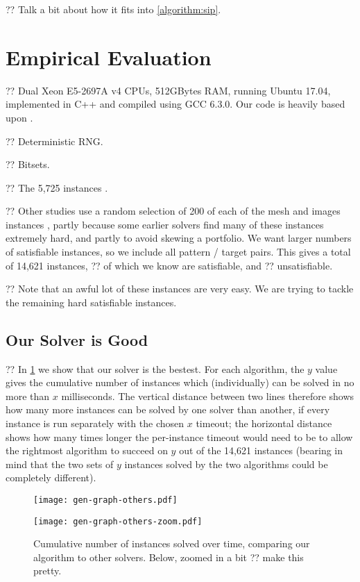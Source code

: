\documentclass{article}
\newcommand{\citet}[1]{\citeauthor{#1} \shortcite{#1}}
\newcommand{\citep}[1]{\cite{#1}}
\begin{document}
?? Talk a bit about how it fits into \cref{algorithm:sip}.

\section{Empirical Evaluation}

?? Dual Xeon E5-2697A v4 CPUs, 512GBytes RAM, running Ubuntu 17.04, implemented in C++ and compiled
using GCC 6.3.0. Our code is heavily based upon \citet{dblp:conf/cp/McCreeshP15}.

?? Deterministic RNG.

?? Bitsets.

?? The 5,725 instances \citep{dblp:conf/lion/KotthoffMS16}.

?? Other studies use a random selection of 200 of each of the mesh and images instances
\citep{DBLP:journals/cviu/DamiandSHJS11}, partly because some earlier solvers find many of these
instances extremely hard, and partly to avoid skewing a portfolio. We want larger numbers of
satisfiable instances, so we include all pattern / target pairs. This gives a total of 14,621
instances, ?? of which we know are satisfiable, and ??  unsatisfiable.

?? Note that an awful lot of these instances are very easy. We are trying to tackle the remaining
hard satisfiable instances.

\subsection{Our Solver is Good}

?? In \cref{figure:others} we show that our solver is the bestest. For each algorithm, the $y$ value
gives the cumulative number of instances which (individually) can be solved in no more than $x$
milliseconds.  The vertical distance between two lines therefore shows how many more instances can
be solved by one solver than another, if every instance is run separately with the chosen $x$
timeout; the horizontal distance shows how many times longer the per-instance timeout would need to
be to allow the rightmost algorithm to succeed on $y$ out of the 14,621 instances (bearing in mind
that the two sets of $y$ instances solved by the two algorithms could be completely different).

\begin{figure}[tb]
    \centering
    \texttt{[image: gen-graph-others.pdf]}

    \centering
    \texttt{[image: gen-graph-others-zoom.pdf]}

    \caption{Cumulative number of instances solved over time, comparing our algorithm to other
    solvers. Below, zoomed in a bit ?? make this pretty.}
    \label{figure:others}
\end{figure}
\end{document}
